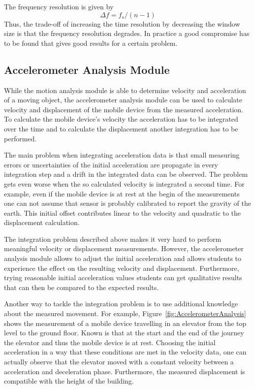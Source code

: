 \documentclass{sigchi}
\begin{document}
The frequency resolution is given by
\[
\Delta f = f_s / (n - 1)
\]
Thus, the trade-off of increasing the time resolution by decreasing the window size is that the frequency resolution degrades.
In practice a good compromise has to be found that gives good results for a certain problem.

\subsection{Accelerometer Analysis Module}
While the motion analysis module is able to determine velocity and acceleration of a moving object, the accelerometer analysis module can be used to calculate velocity and displacement of the mobile device from the measured acceleration.
To calculate the mobile device's velocity the acceleration has to be integrated over the time and to calculate the displacement another integration has to be performed.

The main problem when integrating acceleration data is that small measuring errors or uncertainties of the initial acceleration are propagate in every integration step and a drift in the integrated data can be observed.
The problem gets even worse when the so calculated velocity is integrated a second time.
For example, even if the mobile device is at rest at the begin of the measurements one can not assume that sensor is probably calibrated to report the gravity of the earth.
This initial offset contributes linear to the velocity and quadratic to the displacement calculation.

The integration problem described above makes it very hard to perform meaningful velocity or displacement measurements.
However, the accelerometer analysis module allows to adjust the initial acceleration and allows students to experience the effect on the resulting velocity and displacement.
Furthermore, trying reasonable initial acceleration values students can get qualitative results that can then be compared to the expected results.

Another way to tackle the integration problem is to use additional knowledge about the measured movement.
For example, Figure~\ref{fig:AccelerometerAnalysis} shows the measurement of a mobile device travelling in an elevator from the top level to the ground floor.
Known is that at the start and the end of the journey the elevator and thus the mobile device is at rest.
Choosing the initial acceleration in a way that these conditions are met in the velocity data, one can actually observe that the elevator moved with a constant velocity between a acceleration and deceleration phase.
Furthermore, the measured displacement is compatible with the height of the building.
\end{document}

